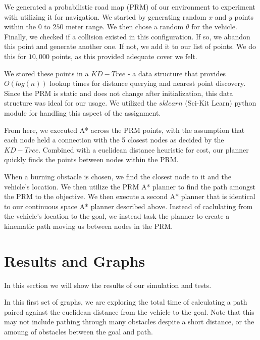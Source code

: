 \documentclass{article}
\begin{document}
We generated a probabilistic road map (PRM) of our environment to experiment with utilizing it for navigation. We started by generating random $x$ and $y$ points within the $0$ to $250$ meter range. We then chose a random $\theta$ for the vehicle. Finally, we checked if a collision existed in this configuration. If so, we abandon this point and generate another one. If not, we add it to our list of points. We do this for $10,000$ points, as this provided adequate cover we felt.

We stored these points in a $KD-Tree$ - a data structure that provides $O(log(n))$ lookup times for distance querying and nearest point discovery. Since the PRM is static and does not change after initialization, this data structure was ideal for our usage. We utilized the $sklearn$ (Sci-Kit Learn) python module for handling this aspect of the assignment.

From here, we executed A* across the PRM points, with the assumption that each node held a connection with the 5 closest nodes as decided by the $KD-Tree$. Combined with a euclidean distance heuristic for cost, our planner quickly finds the points between nodes within the PRM.

When a burning obstacle is chosen, we find the closest node to it and the vehicle's location. We then utilize the PRM A* planner to find the path amongst the PRM to the objective. We then execute a second A* planner that is identical to our continuous space A* planner described above. Instead of caclulating from the vehicle's location to the goal, we instead task the planner to create a kinematic path moving us between nodes in the PRM.

\section*{Results and Graphs}

In this section we will show the results of our simulation and tests.

In this first set of graphs, we are exploring the total time of calculating a path paired against the euclidean distance from the vehicle to the goal. Note that this may not include pathing through many obstacles despite a short distance, or the amoung of obstacles between the goal and path.
\end{document}
